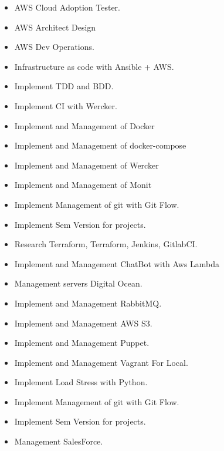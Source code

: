 \documentclass[10pt,a4paper]{altacv}
\begin{document}
\divider

\begin{itemize}
  \item AWS Cloud Adoption Tester.
  \item AWS Architect Design
  \item AWS Dev Operations.
  \item Infrastructure as code with Ansible + AWS.
  \item Implement TDD and BDD.
  \item Implement CI with Wercker.
  \item Implement and Management of Docker
  \item Implement and Management of docker-compose
  \item Implement and Management of Wercker
  \item Implement and Management of Monit
  \item Implement Management of git with Git Flow.
  \item Implement Sem Version for projects.
  \item Research Terraform, Terraform, Jenkins, GitlabCI.
  \item Implement and Management ChatBot with Aws Lambda
\end{itemize}

\divider

\begin{itemize}
  \item Management servers Digital Ocean.
  \item Implement and Management RabbitMQ.
  \item Implement and Management AWS S3.
  \item Implement and Management Puppet.
  \item Implement and Management Vagrant For Local.
  \item Implement Load Stress with Python.
  \item Implement Management of git with Git Flow.
  \item Implement Sem Version for projects.
  \item Management SalesForce.
\end{itemize}

\divider
\end{document}
